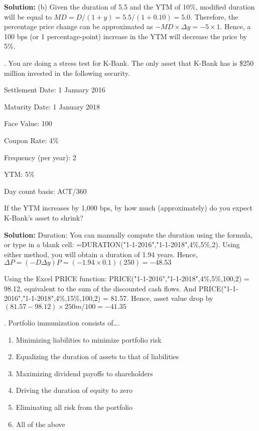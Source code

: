 \documentclass[11.5pt]{article}
\begin{document}
\noindent \textbf{Solution:} (b) Given the duration of 5.5 and the YTM of 10\%, modified duration will be equal to $MD = D/(1+y)=5.5/(1+0.10)=5.0$. Therefore, the percentage price change can be approximated as $-MD \times \Delta y =-5\times1$. Hence, a 100 bps (or 1 percentage-point) increase in the YTM will decrease the price by 5\%.

\vspace{30pt}




. You are doing a stress test for K-Bank. The only asset that K-Bank has is \$250 million invested in the following security.

Settlement Date: 1 January 2016

Maturity Date: 1 January 2018

Face Value: 100

Coupon Rate: 4\%

Frequency (per year): 2

YTM: 5\%

Day count basis: ACT/360


\noindent If the YTM increases by 1,000 bps, by how much (approximately) do you expect K-Bank’s asset to shrink? 

\vspace{20pt}

\noindent \textbf{Solution:}  Duration: You can manually compute the duration using the formula, or type in a blank cell: =DURATION("1-1-2016","1-1-2018",4\%,5\%,2). Using either method, you will obtain a duration of 1.94 years. Hence, $\Delta P =( -D \Delta y)P = (-1.94 \times 0.1)(250) =-48.53 $

Using the Excel PRICE function: PRICE("1-1-2016","1-1-2018",4\%,5\%,100,2) = 98.12, equivalent to the sum of the discounted cash flows. And PRICE("1-1-2016","1-1-2018",4\%,15\%,100,2) = 81.57. Hence, asset value drop by $ (81.57 - 98.12) \times 250m/100= -41.35 $


\vspace{30pt}


\newpage




. Portfolio immunization consists of….


\begin{enumerate}[a]
	
	\item Minimizing liabilities to minimize portfolio risk
	
	\item Equalizing the duration of assets to that of liabilities
	
	\item Maximizing dividend payoffs to shareholders
	
	\item Driving the duration of equity to zero
	
	\item Eliminating all risk from the portfolio
	
	\item All of the above
\end{enumerate}
\end{document}
